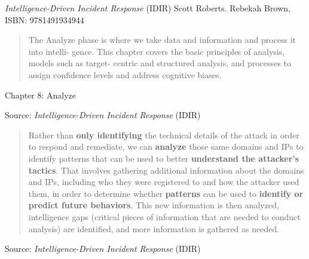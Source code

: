 \documentclass[Screen16to9,17pt]{foils}
\begin{document}






\emph{Intelligence-Driven Incident Response} (IDIR)
 Scott Roberts. Rebekah Brown, ISBN: 9781491934944

\begin{quote}
The Analyze phase is where we take data and information and process it into intelli‐
gence. This chapter covers the basic principles of analysis, models such as target-
centric and structured analysis, and processes to assign confidence levels and address
cognitive biases.
\end{quote}

\begin{list2}
\item Chapter 8: Analyze
\end{list2}


Source: \emph{Intelligence-Driven Incident Response} (IDIR)





\begin{quote}
Rather than {\bf only identifying} the technical details of the attack in order to respond and remediate, we can {\bf analyze} those same domains and IPs to identify patterns that can be used to better {\bf understand the attacker’s tactics}. That involves gathering additional information about the domains and IPs, including who they were registered to and how the attacker used them, in order to determine whether {\bf patterns} can be used to {\bf identify or predict future behaviors}. This new information is then analyzed, intelligence gaps (critical pieces of information that are needed to conduct analysis) are identified, and more information is gathered as needed.
\end{quote}
Source: \emph{Intelligence-Driven Incident Response} (IDIR)



\end{document}
